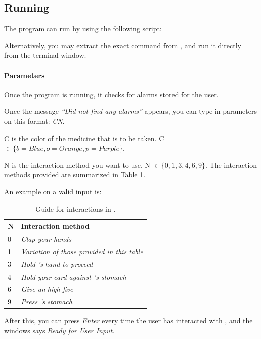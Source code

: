 \subsection{Running}
The program can run by using the following script:


Alternatively, you may extract the exact command from , and run it directly from the terminal window. 

\paragraph{Parameters}

Once the program is running, it checks for alarms stored for the user. 

Once the message \emph{``Did not find any alarms''} appears, you can type in parameters on this format: \emph{CN}. 

C is the color of the medicine that is to be taken. C $\in \{ b = Blue, o = Orange, p = Purple \}$.

N is the interaction method you want to use. N $\in \{ 0, 1, 3, 4, 6, 9\}$. The interaction methods provided are summarized in Table \ref{tab:interactionmethodsguide}.

An example on a valid input is:


\begin{table}[H]
\centering
\begin{tabular}{|p{3.0cm} | p{7.0cm}|}
\hline
\textbf{N} & \textbf{Interaction method} \\
\hline
0 & \emph{Clap your hands} \\
\hline
1 & \emph{Variation of those provided in this table} \\
\hline
3 & \emph{Hold \ab{}'s hand to proceed} \\
\hline
4 & \emph{Hold your card against \ab{}'s stomach}\\
\hline
6 & \emph{Give an high five} \\
\hline
9 & \emph{Press \ab{}'s stomach} \\
\hline
\end{tabular}
\caption{Guide for interactions in \ab{}.}
\label{tab:interactionmethodsguide}
\end{table}

After this, you can press \emph{Enter} every time the user has interacted with \ab{}, and the windows says \emph{Ready for User Input}. 